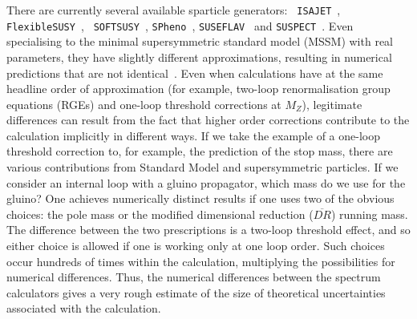 \documentclass[final,3p,times,pdflatex]{elsarticle}
\begin{document}
There are currently several available sparticle generators: {\tt
  ISAJET}~\cite{Paige:2003mg}, {\tt FlexibleSUSY}~\cite{Athron:2014yba},
{\tt 
  SOFTSUSY}~\cite{Allanach:2001kg,Allanach:2009bv,Allanach:2011de,Allanach:2013kza}, 
{\tt SPheno}~\cite{Porod:2003um},
{\tt SUSEFLAV}~\cite{Chowdhury:2011zr} and
{\tt SUSPECT}~\cite{Djouadi:2002ze}. Even specialising to the minimal
supersymmetric standard model (MSSM) with real parameters, 
they have slightly different
approximations, resulting in numerical predictions that are not
identical~\cite{Allanach:2003jw,Allanach:2004rh,Belanger:2005jk}. 
Even when calculations have at the same headline order of approximation (for
example, two-loop renormalisation group equations (RGEs) and one-loop threshold corrections at $M_Z$),
legitimate differences can result from the fact that higher order corrections
contribute to the calculation implicitly in different ways. 
If we take the example of a one-loop threshold correction to, for example, 
the prediction of the stop mass, there are various contributions from Standard
Model and supersymmetric particles. If we consider an internal loop with
a gluino propagator, which mass do we use for the gluino? One achieves
numerically distinct results if one uses two of the obvious choices: the
pole mass or the modified dimensional reduction ($\overline{DR}$) running
mass. The difference between the two prescriptions is a two-loop threshold
effect, and so either choice is allowed if one is working only at one loop order.
Such choices occur hundreds of times within the calculation, multiplying the
possibilities for numerical differences. Thus, the numerical differences
between the spectrum calculators gives a very rough estimate of the size of
theoretical uncertainties associated with the calculation. 
\end{document}
